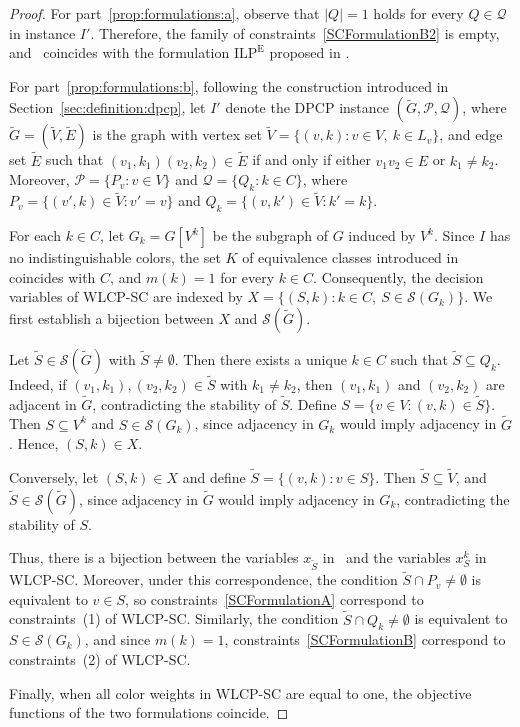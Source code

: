 \documentclass[preprint, 11pt, authoryear]{elsarticle}
\newcommand{\PP}{{\mathcal P}}
\newcommand{\QQ}{{\mathcal Q}}
\newcommand{\STAB}{{\mathscr S}}
\newcommand{\setcoveringform}{\text{DPCP-SCF}}
\begin{document}
\begin{proof}
For part~\ref{prop:formulations:a}, observe that $|Q|=1$ holds for every $Q\in\QQ$ in instance $I'$. Therefore, the family of constraints~\eqref{SCFormulationB2} is empty, and \setcoveringform\ coincides with the formulation $\mathrm{ILP}^{\mathrm{E}}$ proposed in \cite{Furini2018}.

For part~\ref{prop:formulations:b}, following the construction introduced in Section~\ref{sec:definition:dpcp}, let $I'$ denote the DPCP instance $(\tilde G,\PP,\QQ)$, where $\tilde G=(\tilde V,\tilde E)$ is the graph with vertex set
$\tilde V=\{(v,k):v\in V,\ k\in L_v\}$,
and edge set $\tilde E$ such that $(v_1,k_1)(v_2,k_2)\in\tilde E$ if and only if either $v_1v_2\in E$ or $k_1\neq k_2$. Moreover, 
$\PP = \{P_v:v\in V\}$ and  
$\QQ = \{Q_k:k\in C\}$, where
$P_v=\{(v',k)\in\tilde V: v'=v\}$ and 
$Q_k=\{(v,k')\in\tilde V: k' = k\}$.

For each $k\in C$, let $G_k=G[V^k]$ be the subgraph of $G$ induced by $V^k$.
Since $I$ has no indistinguishable colors, the set $K$ of equivalence classes introduced in \cite{Lucci2024} coincides with $C$, and $m(k)=1$ for every $k\in C$. Consequently, the decision variables of WLCP-SC are indexed by
$X=\{(S,k):k\in C,\ S\in\STAB(G_k)\}$.
We first establish a bijection between $X$ and $\STAB(\tilde G)$.

Let $\tilde S\in\STAB(\tilde G)$ with $\tilde S\neq\emptyset$. Then there exists a unique $k\in C$ such that $\tilde S\subseteq Q_k$. Indeed, if $(v_1,k_1),(v_2,k_2)\in\tilde S$ with $k_1\neq k_2$, then $(v_1,k_1)$ and $(v_2,k_2)$ are adjacent in $\tilde G$, contradicting the stability of $\tilde S$. Define $S=\{v\in V:(v,k)\in\tilde S\}$.
Then $S\subseteq V^k$ and $S\in\STAB(G_k)$, since adjacency in $G_k$ would imply adjacency in $\tilde G$. Hence, $(S,k)\in X$.

Conversely, let $(S,k)\in X$ and define
$
\tilde S=\{(v,k):v\in S\}
$.
Then $\tilde S\subseteq\tilde V$, and $\tilde S\in\STAB(\tilde G)$, since adjacency in $\tilde G$ would imply adjacency in $G_k$, contradicting the stability of $S$.

Thus, there is a bijection between the variables $x_{\tilde S}$ in \setcoveringform\ and the variables $x_S^k$ in WLCP-SC.
Moreover, under this correspondence, the condition $\tilde S\cap P_v\neq\emptyset$ is equivalent to $v\in S$, so constraints~\eqref{SCFormulationA} correspond to constraints~(1) of WLCP-SC. Similarly, the condition $\tilde S\cap Q_k\neq\emptyset$ is equivalent to $S\in\STAB(G_k)$, and since $m(k)=1$, constraints~\eqref{SCFormulationB} correspond to constraints~(2) of WLCP-SC.

Finally, when all color weights in WLCP-SC are equal to one, the objective functions of the two formulations coincide.
\end{proof}
\end{document}
